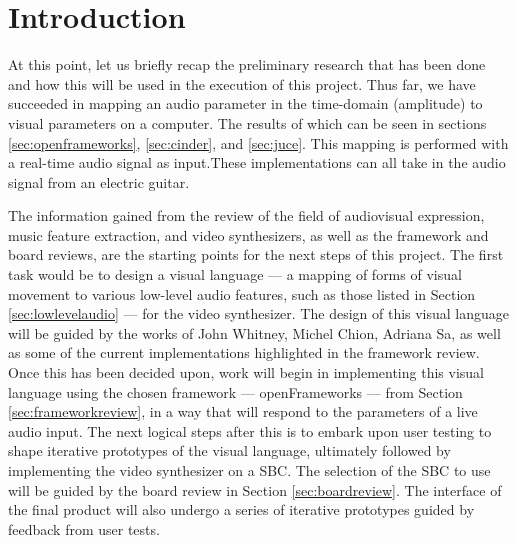 \documentclass[../initial_thesis.tex]{subfiles}
\begin{document}
\section{Introduction}


At this point, let us briefly recap the preliminary research that has been done and how this will be used in the execution of this project. Thus far, we have succeeded in mapping an audio parameter in the time-domain (amplitude) to visual parameters on a computer. The results of which can be seen in sections \ref{sec:openframeworks}, \ref{sec:cinder}, and \ref{sec:juce}. This mapping is performed with a real-time audio signal as input.\footnotemark These implementations can all take in the audio signal from an electric guitar. \par
{}

The information gained from the review of the field of audiovisual expression, music feature extraction, and video synthesizers, as well as the framework and board reviews, are the starting points for the next steps of this project. The first task would be to design a visual language --- a mapping of forms of visual movement to various low-level audio features, such as those listed in Section \ref{sec:lowlevelaudio} --- for the video synthesizer. The design of this visual language will be guided by the works of John Whitney, Michel Chion, Adriana Sa, as well as some of the current implementations highlighted in the framework review. Once this has been decided upon, work will begin in implementing this visual language using the chosen framework --- openFrameworks --- from Section \ref{sec:frameworkreview}, in a way that will respond to the parameters of a live audio input. The next logical steps after this is to embark upon user testing to shape iterative prototypes of the visual language, ultimately followed by implementing the video synthesizer on a SBC. The selection of the SBC to use will be guided by the board review in Section \ref{sec:boardreview}. The interface of the final product will also undergo a series of iterative prototypes guided by feedback from user tests.
\end{document}
